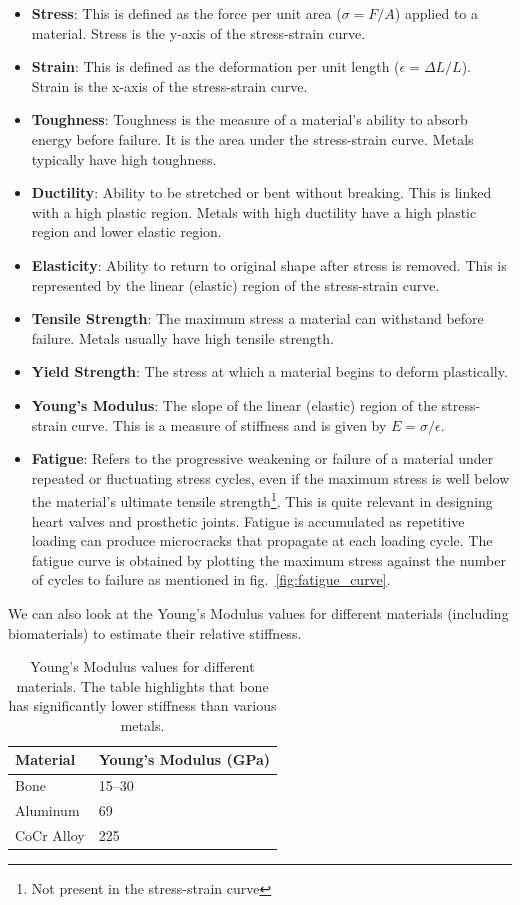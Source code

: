 \documentclass[12pt]{article}
\begin{document}
\begin{itemize}
    \item \textbf{Stress}: This is defined as the force per unit area ($\sigma = F/A$) applied to a material. Stress is the y-axis of the stress-strain curve.
    \item \textbf{Strain}: This is defined as the deformation per unit length ($\epsilon = \Delta L / L$). Strain is the x-axis of the stress-strain curve.
    \item \textbf{Toughness}: Toughness is the measure of a material's ability to absorb energy before failure. It is the area under the stress-strain curve. Metals typically have high toughness.
    \item \textbf{Ductility}: Ability to be stretched or bent without breaking. This is linked with a high plastic region. Metals with high ductility have a high plastic region and lower elastic region.
    \item \textbf{Elasticity}: Ability to return to original shape after stress is removed. This is represented by the linear (elastic) region of the stress-strain curve.
    \item \textbf{Tensile Strength}: The maximum stress a material can withstand before failure. Metals usually have high tensile strength.
    \item \textbf{Yield Strength}: The stress at which a material begins to deform plastically.
    \item \textbf{Young's Modulus}: The slope of the linear (elastic) region of the stress-strain curve. This is a measure of stiffness and is given by $E = \sigma/\epsilon$.
    \item \textbf{Fatigue}: Refers to the progressive weakening or failure of a material under repeated or fluctuating stress cycles, even if the maximum stress is well below the material's ultimate tensile strength\footnote{Not present in the stress-strain curve}. This is quite relevant in designing heart valves and prosthetic joints. Fatigue is accumulated as repetitive loading can produce microcracks that propagate at each loading cycle. The fatigue curve is obtained by plotting the maximum stress against the number of cycles to failure as mentioned in fig.~\ref{fig:fatigue_curve}.
\end{itemize}

We can also look at the Young's Modulus values for different materials
(including biomaterials) to estimate their relative stiffness.
\begin{table}[h]
    \centering
    \begin{tabular}{ll}
        \toprule
        Material   & Young's Modulus (GPa) \\
        \midrule
        Bone       & 15--30                \\
        Aluminum   & 69                    \\
        CoCr Alloy & 225                   \\
        \bottomrule
    \end{tabular}
    \caption{Young's Modulus values for different materials. The table highlights that bone has significantly lower stiffness than various metals.}\label{tab:youngs_modulus}
\end{table}
\end{document}
